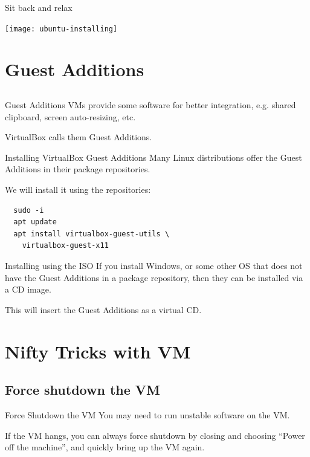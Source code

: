 \documentclass[12pt]{beamer}
\begin{document}
\begin{frame}{Sit back and relax}
  \begin{center}
    \texttt{[image: ubuntu-installing]}
  \end{center}
\end{frame}

\section{Guest Additions}
\subsection{}
\begin{frame}{Guest Additions}
  VMs provide some software for better integration, e.g. shared clipboard, screen auto-resizing, etc.

  VirtualBox calls them Guest Additions.
\end{frame}

\begin{frame}[fragile]{Installing VirtualBox Guest Additions}
  Many Linux distributions offer the Guest Additions in their package repositories.

  We will install it using the repositories:

  \begin{verbatim}
  sudo -i
  apt update
  apt install virtualbox-guest-utils \
    virtualbox-guest-x11
  \end{verbatim}
\end{frame}

\begin{frame}{Installing using the ISO}
  If you install Windows, or some other OS that does not have the Guest Additions
  in a package repository, then they can be installed via a CD image.


  This will insert the Guest Additions as a virtual CD.
\end{frame}

\section{Nifty Tricks with VM}
\subsection{Force shutdown the VM}
\begin{frame}{Force Shutdown the VM}
  You may need to run unstable software on the VM.

  If the VM hangs, you can always force shutdown by closing and choosing ``Power off the machine'', and quickly bring up the VM again.
\end{frame}
\end{document}
